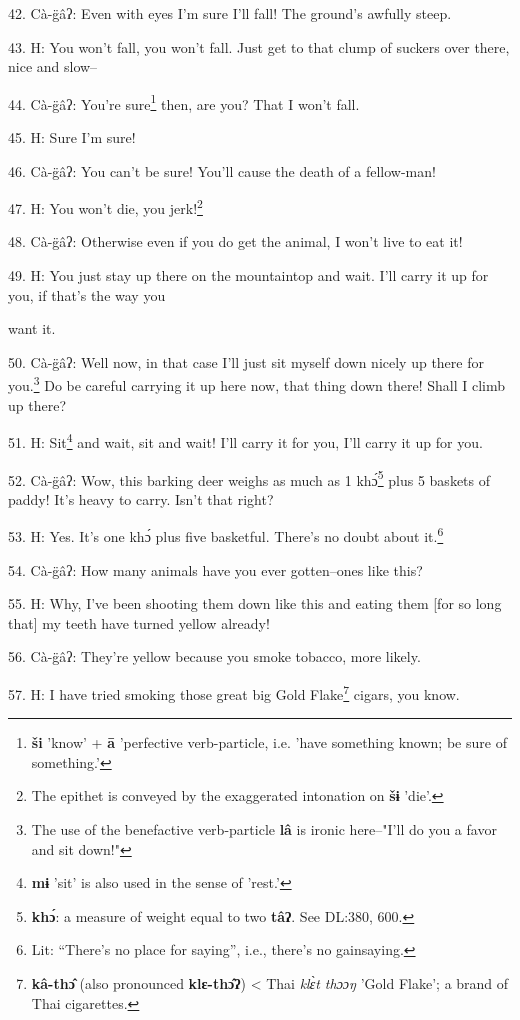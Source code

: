 42. Cà-g̈âʔ: Even with eyes I'm sure I'll fall! The ground's awfully steep.

43. H: You won't fall, you won't fall. Just get to that clump of suckers over there,
nice and slow--

44. Cà-g̈âʔ: You're sure\footnote{\textbf{ši} 'know' + \textbf{ā} 'perfective verb-particle, i.e. 'have something known; be sure of something.'} then, are you? That I won't fall.

45. H: Sure I'm sure!

46. Cà-g̈âʔ: You can't be sure! You'll cause the death of a fellow-man!

47. H: You won't die, you jerk!\footnote{The epithet is conveyed by the exaggerated intonation on \textbf{šɨ} 'die'.}

48. Cà-g̈âʔ: Otherwise even if you do get the animal, I won't live to eat it!

49. H: You just stay up there on the mountaintop and wait. I'll carry it up for
you, if that's the way you

want it.

50. Cà-g̈âʔ: Well now, in that case I'll just sit myself down nicely up there
for you.\footnote{The use of the benefactive verb-particle \textbf{lâ} is ironic here--"I'll do you a favor and sit down!"} Do be careful carrying it up here now, that thing down there! Shall
I climb up there?

51. H: Sit\footnote{\textbf{mɨ} 'sit' is also used in the sense of 'rest.'} and wait, sit and wait! I'll carry it for you, I'll carry it up
for you.


52. Cà-g̈âʔ: Wow, this barking deer weighs as much as 1 khɔ́\footnote{\textbf{khɔ́}: a measure of weight equal to two \textbf{tâʔ}. See DL:380, 600.} plus 5
baskets of paddy! It's heavy to carry. Isn't that right?

53. H: Yes. It's one khɔ́ plus five basketful. There's no doubt about it.\footnote{Lit: ``There's no place for saying'', i.e., there's no gainsaying.}

54. Cà-g̈âʔ: How many animals have you ever gotten--ones like this?

55. H: Why, I've been shooting them down like this and eating them [for so long
that] my teeth have turned yellow already!

56. Cà-g̈âʔ: They're yellow because you smoke tobacco, more likely.

57. H: I have tried smoking those great big Gold Flake\footnote{\textbf{kâ-thɔ̂} (also pronounced \textbf{klɛ-thɔ̂ʔ}) < Thai\textit{ klɛ̀t thɔɔŋ} 'Gold Flake'; a brand of Thai cigarettes.} cigars, you know.

